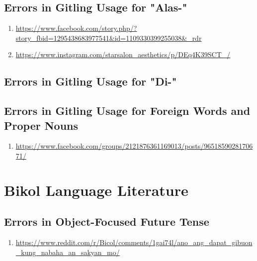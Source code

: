 \subsection{Errors in Gitling Usage for "Alas-"}

\begin{enumerate}
    \item \url{https://www.facebook.com/story.php/?story_fbid=1295438683977541&id=1109330399255038&_rdr} \\
    \item \url{https://www.instagram.com/starsalon_aesthetics/p/DEq4K39SCT_/} \\
\end{enumerate}

\subsection{Errors in Gitling Usage for "Di-"}
\subsection{Errors in Gitling Usage for Foreign Words and Proper Nouns}

\begin{enumerate}
    \item \url{https://www.facebook.com/groups/2121876361169013/posts/9651859028170671/} \\
\end{enumerate}

\section{Bikol Language Literature}

\subsection{Errors in Object-Focused Future Tense}
\begin{enumerate}
    \item \url{https://www.reddit.com/r/Bicol/comments/1gai74l/ano_ang_dapat_gibuon_kung_nabaha_an_sakyan_mo/} \\ 
\end{enumerate}

